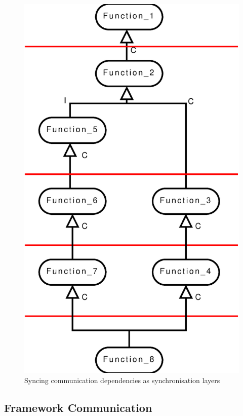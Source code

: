 \documentclass[a4paper,11pt]{article}
\begin{document}
\begin{figure}
\begin{center}
\includegraphics*[scale=0.5]{example_dgraph_1_sync.eps}
\caption{Syncing communication dependencies as synchronisation layers}
\label{fig:dsyncexample}
\end{center}
\end{figure}

\subsection{Framework Communication}
\end{document}
